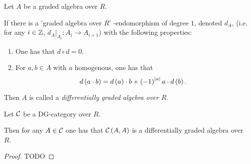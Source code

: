 \begin{definition}
    Let \( A \) be a graded algebra over \( R \).

    If there is a 'graded algebra over \( R \)' -endomorphism of degree \( 1 \), denoted \( d_A \), (i.e. for any \( i \in {\mathbb{Z}} \), \( d_A |_{A_i}: A_i \to A_{i + 1} \))
    with the following properties:
    \begin{enumerate}
        \item One has that \( d \circ d = 0 \).
        \item {
            For \( a, b \in A \) with \( a \) homogenous, one has that
            \[
                d\left( a \cdot b \right)
                =
                d\left( a \right) \cdot b + \left( -1 \right)^{\lvert a \rvert}a \cdot d\left( b \right).
            \]
            }
    \end{enumerate}

    Then \( A \) is called a \emph{differentially graded algebra over \( R \)}.
\end{definition}

\begin{theorem}
    Let \( {\mathcal{C}} \) be a DG-category over \( R \).

    Then for any \( A \in {\mathcal{C}} \) one has that \( {\mathcal{C}} \left( A, A \right) \) is a differentially graded algebra over \( R \).
\end{theorem}

\begin{proof}
    TODO
\end{proof}
